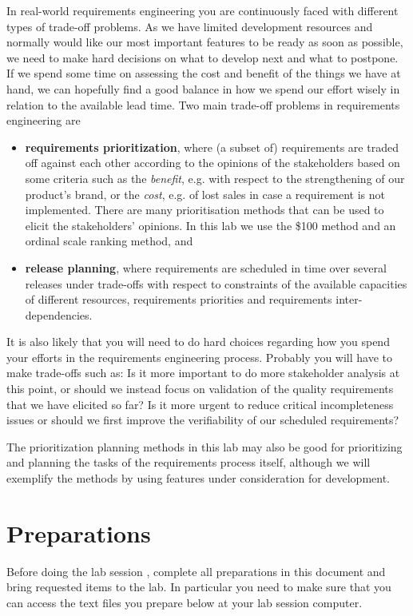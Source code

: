 \documentclass[11pt]{article}
\begin{document}
In real-world requirements engineering you are continuously faced with different types of trade-off problems. As we have limited development resources and normally would like our most important features to be ready as soon as possible, we need to make hard decisions on what to develop next and what to postpone. If we spend some time on assessing the cost and benefit of the things we have at hand, we can hopefully find a good balance in how we spend our effort wisely in relation to the available lead time. Two main trade-off problems in requirements engineering are
\begin{itemize}
\item {\bf requirements prioritization}, where (a subset of) requirements are traded off against each other according to the opinions of the stakeholders based on some criteria such as the {\it benefit}, e.g. with respect to the strengthening of our product's brand, or the {\it cost}, e.g. of lost sales in case a requirement is not implemented. There are many prioritisation methods that can be used to elicit the stakeholders'
opinions. In this lab we use the \$100 method and an ordinal scale ranking method, and
\item {\bf release planning}, where requirements are scheduled in time over several releases under trade-offs with respect to constraints of the available capacities of different resources, requirements priorities and requirements inter-dependencies. 
\end{itemize}

It is also likely that you will need to do hard choices regarding how you spend your efforts in the requirements engineering process. Probably you will have to make trade-offs such as: Is it more important to do more stakeholder analysis at this point, or should we instead focus on validation of the quality requirements that we have elicited so far? Is it more urgent to reduce critical incompleteness issues or should we first improve the verifiability of our scheduled requirements?

The prioritization planning methods in this lab may also be good for prioritizing and planning the tasks of the requirements process itself, although we will exemplify the methods by using features under consideration for development.



\clearpage\newpage
\section{Preparations}\label{section:prep}
\begin{framed} \noindent Before doing the lab session%
, complete all preparations in this document %
and bring requested items to the lab. In particular you need to make sure that you can access the text files you prepare below at your lab session computer.
\end{framed}
\end{document}
